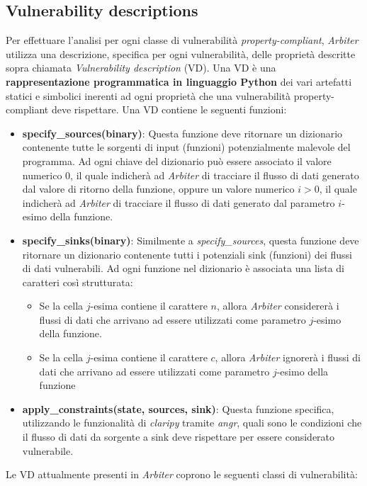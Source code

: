 \documentclass[../main.tex]{subfiles}
\begin{document}
\subsection{Vulnerability descriptions} 
Per effettuare l'analisi per ogni classe di vulnerabilità \textit{property-compliant}, \textit{Arbiter} utilizza una descrizione, specifica per ogni vulnerabilità, delle proprietà descritte sopra chiamata \textit{Vulnerability description} (VD).
Una VD è una \textbf{rappresentazione programmatica in linguaggio Python} dei vari artefatti statici e simbolici inerenti ad ogni proprietà che una vulnerabilità property-compliant deve rispettare.
Una VD contiene le seguenti funzioni:
\begin{itemize}
    \item \textbf{specify\_sources(binary)}: Questa funzione deve ritornare un dizionario contenente tutte le sorgenti di input (funzioni) potenzialmente malevole  del programma. Ad ogni chiave del dizionario può
    essere associato il valore numerico $0$, il quale indicherà ad \textit{Arbiter} di tracciare il flusso di dati generato dal valore di ritorno della funzione, oppure un valore numerico $i > 0$, il quale indicherà ad \textit{Arbiter} di
    tracciare il flusso di dati generato dal parametro $i$-esimo della funzione.
    \item \textbf{specify\_sinks(binary)}: Similmente a \textit{specify\_sources}, questa funzione deve ritornare un dizionario contenente tutti i potenziali sink (funzioni) dei flussi di dati vulnerabili. Ad ogni funzione nel dizionario è associata una lista di caratteri così strutturata:
    \begin{itemize}
        \item Se la cella $j$-esima contiene il carattere $n$, allora \textit{Arbiter} considererà i flussi di dati che arrivano ad essere utilizzati come parametro $j$-esimo della funzione.
        \item Se la cella $j$-esima contiene il carattere $c$, allora \textit{Arbiter} ignorerà i flussi di dati che arrivano ad essere utilizzati come parametro $j$-esimo della funzione
    \end{itemize}
    \item \textbf{apply\_constraints(state, sources, sink)}: Questa funzione specifica, utilizzando le funzionalità di \textit{claripy} tramite \textit{angr}, quali sono le condizioni che il flusso di dati da sorgente a sink deve rispettare
    per essere considerato vulnerabile.
\end{itemize}
Le VD attualmente presenti in \textit{Arbiter} coprono le seguenti classi di vulnerabilità:
\end{document}
